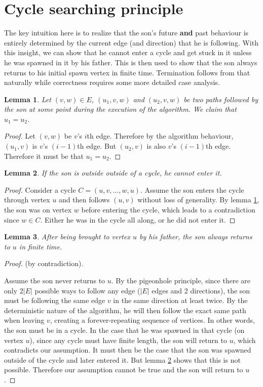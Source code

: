 \documentclass{article}
\newtheorem{lemma}{Lemma}
\begin{document}
\newpage
\section{Cycle searching principle}

The key intuition here is to realize that the son's future \textbf{and} past behaviour is entirely determined by the current edge (and direction) that he is following. With this insight, we can show that he cannot enter a cycle and get stuck in it unless he was spawned in it by his father. This is then used to show that the son always returns to his initial spawn vertex in finite time. Termination follows from that naturally while correctness requires some more detailed case analysis.

\begin{lemma}\label{lemma_deter}
Let $(v,w)\in E$, $(u_1,v,w)$ and $(u_2,v,w)$ be two paths followed by the son at some point during the execution of the algorithm. We claim that $u_1=u_2$.
\end{lemma}
\begin{proof}
Let $(v,w)$ be $v$'s $i$th edge. Therefore by the algorithm behaviour, $(u_1,v)$ is $v$'s $(i-1)$th edge. But $(u_2,v)$ is also $v$'s $(i-1)$th edge. Therefore it must be that $u_1=u_2$.
\end{proof}

\begin{lemma}\label{lemma_entercycle}
If the son is outside outside of a cycle, he cannot enter it.
\end{lemma}
\begin{proof}
Consider a cycle $C=(u,v,\dotsc,w,u)$. Assume the son enters the cycle through vertex $u$ and then follows $(u,v)$ without loss of generality. By lemma \ref{lemma_deter}, the son was on vertex $w$ before entering the cycle, which leads to a contradiction since $w \in C$. Either he was in the cycle all along, or he did not enter it.
\end{proof}

\begin{lemma}\label{lemma_finite}
After being brought to vertex $u$ by his father, the son always returns to $u$ in finite time.
\end{lemma}
\begin{proof} (by contradiction).

Assume the son never returns to $u$. By the pigeonhole principle, since there are only $2|E|$ possible ways to follow any edge ($|E|$ edges and 2 directions), the son must be following the same edge $v$ in the same direction at least twice. By the deterministic nature of the algorithm, he will then follow the exact same path when leaving $v$, creating a forever-repeating sequence of vertices. In other words, the son must be in a cycle. In the case that he was spawned in that cycle (on vertex $u$), since any cycle must have finite length, the son will return to $u$, which contradicts our assumption. It must then be the case that the son was spawned outside of the cycle and later entered it. But lemma \ref{lemma_entercycle} shows that this is not possible. Therefore our assumption cannot be true and the son will return to $u$.
\end{proof}
\end{document}
